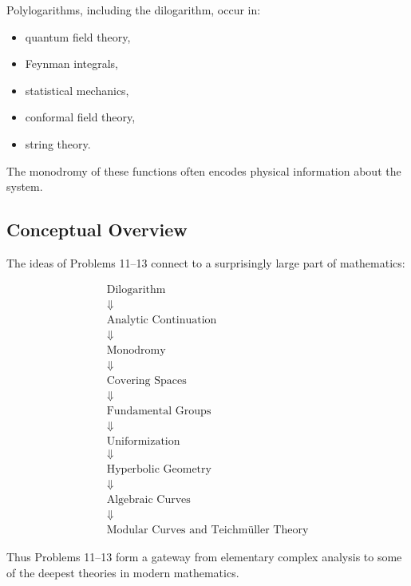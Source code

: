 \documentclass[12pt,a4paper]{article}
\theoremstyle{notespace}
\begin{document}
Polylogarithms, including the dilogarithm, occur in:

\begin{itemize}
	\item quantum field theory,
	\item Feynman integrals,
	\item statistical mechanics,
	\item conformal field theory,
	\item string theory.
\end{itemize}

The monodromy of these functions often encodes physical information about the system.

\subsection{Conceptual Overview}

The ideas of Problems 11--13 connect to a surprisingly large part of mathematics:

\[
\boxed{
	\begin{array}{c}
		\text{Dilogarithm} \\
		\Downarrow \\
		\text{Analytic Continuation} \\
		\Downarrow \\
		\text{Monodromy} \\
		\Downarrow \\
		\text{Covering Spaces} \\
		\Downarrow \\
		\text{Fundamental Groups} \\
		\Downarrow \\
		\text{Uniformization} \\
		\Downarrow \\
		\text{Hyperbolic Geometry} \\
		\Downarrow \\
		\text{Algebraic Curves} \\
		\Downarrow \\
		\text{Modular Curves and Teichmüller Theory}
	\end{array}
}
\]

Thus Problems 11--13 form a gateway from elementary complex analysis to some of the deepest theories in modern mathematics.
\end{document}
